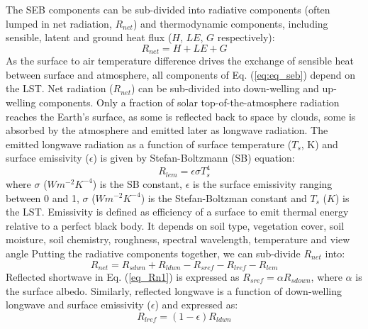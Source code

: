 \documentclass[fleqn,10pt]{wlscirep}
\begin{document}
The SEB components can be sub-divided into radiative components (often lumped in net radiation, $R_{net}$) and thermodynamic components, including sensible, latent and ground heat flux ($H$, $LE$, $G$ respectively):
\begin{equation}\label{eq:eq_seb}
R_{net} = H + LE + G 
\end{equation}
As the surface to air temperature difference drives the exchange of sensible heat between surface and atmosphere, all components of Eq. (\ref{eq:eq_seb}) depend on the LST. Net radiation ($R_{net}$) can be sub-divided into down-welling and up-welling components. Only a fraction of solar top-of-the-atmosphere radiation reaches the Earth's surface, as some is reflected back to space by clouds, some is absorbed by the atmosphere and emitted later as longwave radiation. The emitted longwave radiation as a function of surface temperature ($T_s$, K) and surface emissivity ($\epsilon$) is given by Stefan-Boltzmann (SB) equation:
\begin{equation}\label{eq_Rlem}
R_{lem}= \epsilon \sigma T_{s}^{4}
\end{equation}
where $\sigma$ ($Wm^{-2}K^{-4}$) is the SB constant, $\epsilon$ is the surface emissivity ranging between 0 and 1, $\sigma$ ($Wm^{-2}K^{-4}$) is the Stefan-Boltzman constant and $T_{s}$ ($K$) is the LST. %
Emissivity is defined as efficiency of a surface to emit thermal energy relative to a perfect black body. It  depends on soil type, vegetation cover, soil moisture, soil chemistry, roughness, spectral wavelength, temperature and view angle\cite{norman1995terminology} 
Putting the radiative components together, we can sub-divide $R_{net}$ into:
\begin{equation}\label{eq_Rn1}
R_{net} = R_{sdwn} + R_{ldwn} - R_{sref} - R_{lref} - R_{lem}
\end{equation}
Reflected shortwave in Eq. ({\ref{eq_Rn1}}) is expressed as $R_{sref} = \alpha R_{sdown}$, where $\alpha$ is the surface albedo. Similarly, reflected longwave is a function of down-welling longwave and surface emissivity ($\epsilon$) and expressed as:
\begin{equation}\label{eq_Rlref}
R_{lref} = (1 - \epsilon) R_{ldwn} 
\end{equation}
\end{document}
